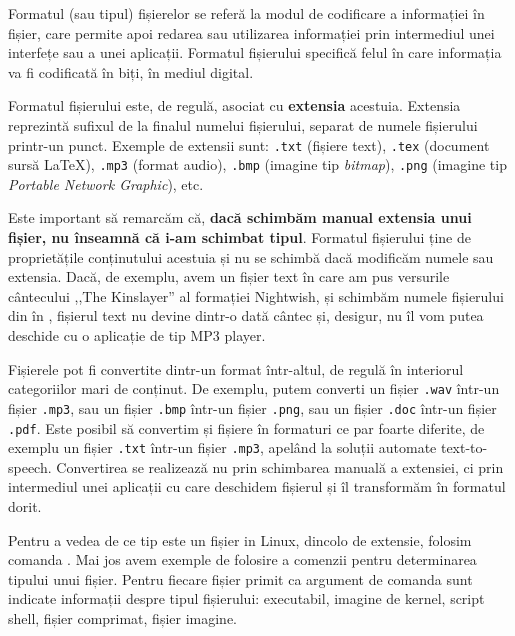 Formatul (sau tipul) fișierelor se referă la modul de
codificare a informației în fișier, care permite apoi redarea sau utilizarea
informației prin intermediul unei interfețe sau a unei aplicații. Formatul
fișierului specifică felul în care informația va fi codificată în biți, în
mediul digital.

Formatul fișierului este, de regulă, asociat cu \textbf{extensia} acestuia.
Extensia reprezintă sufixul de la finalul numelui fișierului, separat de numele
fișierului printr-un punct. Exemple de extensii sunt: \texttt{.txt}
(fișiere text), \texttt{.tex} (document sursă LaTeX), \texttt{.mp3} (format audio), \texttt{.bmp} (imagine tip
\textit{bitmap}), \texttt{.png} (imagine tip \textit{Portable Network Graphic}), etc.

Este important să remarcăm că, \textbf{dacă schimbăm manual extensia unui
fișier, nu înseamnă că i-am schimbat tipul}. Formatul fișierului ține de
proprietățile conținutului acestuia și nu se schimbă dacă modificăm numele sau
extensia. Dacă, de exemplu, avem un fișier text în care am pus versurile
cântecului ,,The Kinslayer'' al formației Nightwish, și schimbăm numele
fișierului din  în , fișierul text nu devine
dintr-o dată cântec și, desigur, nu îl vom putea deschide cu o aplicație de tip MP3
player.

Fișierele pot fi convertite dintr-un format într-altul, de regulă în interiorul
categoriilor mari de conținut. De exemplu, putem converti un fișier \texttt{.wav} într-un fișier \texttt {.mp3},
sau un fișier \texttt{.bmp} într-un fișier \texttt{.png}, sau un fișier \texttt{.doc} într-un fișier \texttt{.pdf}. Este posibil să convertim și
fișiere în formaturi ce par foarte diferite, de exemplu un fișier \texttt{.txt} într-un fișier \texttt{.mp3},
apelând la soluții automate text-to-speech. Convertirea se realizează
nu prin schimbarea manuală a extensiei, ci prin intermediul unei aplicații cu
care deschidem fișierul și îl transformăm în formatul dorit.

Pentru a vedea de ce tip este un fișier in Linux, dincolo de extensie, folosim comanda . Mai jos avem exemple de folosire a comenzii  pentru determinarea tipului unui fișier. Pentru fiecare fișier primit ca argument de comanda  sunt indicate informații despre tipul fișierului: executabil, imagine de kernel, script shell, fișier comprimat, fișier imagine.

